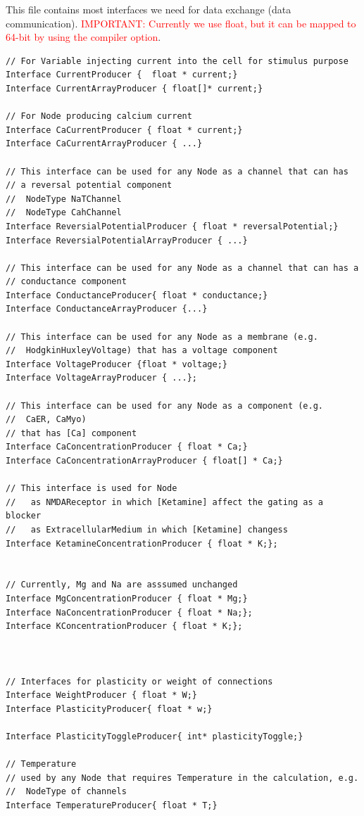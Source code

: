 This file contains most interfaces we need for data exchange (data
communication). \textcolor{red}{IMPORTANT: Currently we use float, but it can be
mapped to 64-bit by using the compiler option}.

{\tiny
\begin{verbatim}
// For Variable injecting current into the cell for stimulus purpose
Interface CurrentProducer {  float * current;}
Interface CurrentArrayProducer { float[]* current;}

// For Node producing calcium current
Interface CaCurrentProducer { float * current;}
Interface CaCurrentArrayProducer { ...}

// This interface can be used for any Node as a channel that can has 
// a reversal potential component
//  NodeType NaTChannel
//  NodeType CahChannel 
Interface ReversialPotentialProducer { float * reversalPotential;}
Interface ReversialPotentialArrayProducer { ...}

// This interface can be used for any Node as a channel that can has a
// conductance component
Interface ConductanceProducer{ float * conductance;}
Interface ConductanceArrayProducer {...}

// This interface can be used for any Node as a membrane (e.g.
//  HodgkinHuxleyVoltage) that has a voltage component
Interface VoltageProducer {float * voltage;}
Interface VoltageArrayProducer { ...};

// This interface can be used for any Node as a component (e.g.
//  CaER, CaMyo)
// that has [Ca] component
Interface CaConcentrationProducer { float * Ca;}
Interface CaConcentrationArrayProducer { float[] * Ca;}

// This interface is used for Node 
//   as NMDAReceptor in which [Ketamine] affect the gating as a blocker
//   as ExtracellularMedium in which [Ketamine] changess
Interface KetamineConcentrationProducer { float * K;};


// Currently, Mg and Na are asssumed unchanged
Interface MgConcentrationProducer { float * Mg;}
Interface NaConcentrationProducer { float * Na;};
Interface KConcentrationProducer { float * K;};



// Interfaces for plasticity or weight of connections
Interface WeightProducer { float * W;}
Interface PlasticityProducer{ float * w;}

Interface PlasticityToggleProducer{ int* plasticityToggle;}

// Temperature 
// used by any Node that requires Temperature in the calculation, e.g. 
//  NodeType of channels
Interface TemperatureProducer{ float * T;}


\end{verbatim}}
